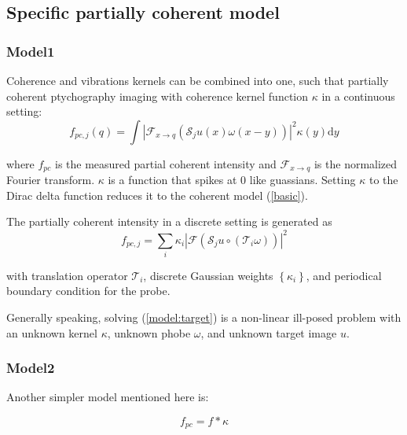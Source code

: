 \documentclass{article}
\numberwithin{equation}{section}
\begin{document}
\subsection{Specific partially coherent model}
 \label{section:specific models}

\subsubsection{Model1\cite{chang}}
Coherence and vibrations kernels can be combined into one, such that partially coherent ptychography imaging with coherence kernel function $\kappa$ in a continuous setting:
\begin{equation}
f_{p c, j}(q) = \int\left|\mathcal{F}_{x \rightarrow q}\left(\mathcal{S}_{j} u(x) \omega(x-y)\right)\right|^{2} \kappa(y) \mathrm{d} y
\end{equation}

where $f_{p c}$ is the measured partial coherent intensity and $\mathcal{F}_{x \rightarrow q}$ is the normalized Fourier transform. $\kappa$ is a function that spikes at 0 like guassians. Setting $\kappa$ to the Dirac delta function reduces it to the coherent model (\ref{basic}).

The partially coherent intensity in a discrete setting is generated as
\begin{equation}
f_{p c, j}=\sum_{i} \kappa_{i}\left|\mathcal{F}\left( \mathcal{S}_{j} u \circ \left(\mathcal{T}_{i} \omega\right) \right)\right|^{2}
\label{model:target}
\end{equation}


with translation operator $\mathcal{T}_{i}$, discrete Gaussian weights $\left\{\kappa_{i}\right\}$, and periodical boundary condition for the probe.

Generally speaking, solving (\ref{model:target}) is a non-linear
ill-posed problem with an unknown kernel $\kappa$, unknown phobe $\omega$, and unknown target image $u$. 



\subsubsection{Model2\cite{psf}}
Another simpler model mentioned here is:

\begin{equation}
\label{simple}
    f_{p c}=f * \kappa
\end{equation}
\end{document}
